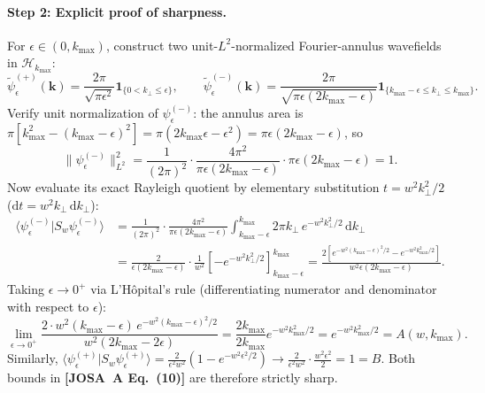 \documentclass[10pt,letterpaper]{article}
\newcommand{\braket}[2]{\langle #1 | #2 \rangle}
\newcommand{\norm}[1]{\lVert #1 \rVert}
\newcommand{\dd}{\mathrm{d}}
\newcommand{\josa}[1]{\textbf{[JOSA~A Eq.~(#1)]}}
\numberwithin{equation}{section}
\begin{document}
\paragraph*{Step 2: Explicit proof of sharpness.}
For $\epsilon \in (0, k_{\max})$, construct two unit-$L^2$-normalized Fourier-annulus wavefields in $\mathcal{H}_{k_{\max}}$:
\begin{equation}
  \widetilde{\psi}_\epsilon^{(+)}(\mathbf{k}) = \frac{2\pi}{\sqrt{\pi\epsilon^2}}\mathbf{1}_{\{0 < k_\perp \le \epsilon\}}, \qquad
  \widetilde{\psi}_\epsilon^{(-)}(\mathbf{k}) = \frac{2\pi}{\sqrt{\pi\epsilon(2k_{\max}-\epsilon)}}\mathbf{1}_{\{k_{\max}-\epsilon \le k_\perp \le k_{\max}\}}.
\end{equation}
Verify unit normalization of $\psi_\epsilon^{(-)}$: the annulus area is $\pi[k_{\max}^2 - (k_{\max}-\epsilon)^2] = \pi(2k_{\max}\epsilon - \epsilon^2) = \pi\epsilon(2k_{\max}-\epsilon)$, so
\begin{equation}
  \norm{\psi_\epsilon^{(-)}}_{L^2}^2 = \frac{1}{(2\pi)^2}\cdot\frac{4\pi^2}{\pi\epsilon(2k_{\max}-\epsilon)}\cdot\pi\epsilon(2k_{\max}-\epsilon) = 1.
\end{equation}
Now evaluate its exact Rayleigh quotient by elementary substitution $t = w^2 k_\perp^2/2$ ($\dd t = w^2 k_\perp\,\dd k_\perp$):
\begin{align}
  \braket{\psi_\epsilon^{(-)}}{S_w\psi_\epsilon^{(-)}} &= \frac{1}{(2\pi)^2}\cdot\frac{4\pi^2}{\pi\epsilon(2k_{\max}-\epsilon)}\int_{k_{\max}-\epsilon}^{k_{\max}} 2\pi k_\perp\,e^{-w^2 k_\perp^2/2}\,\dd k_\perp \nonumber \\
  &= \frac{2}{\epsilon(2k_{\max}-\epsilon)}\cdot\frac{1}{w^2}\left[-e^{-w^2 k_\perp^2/2}\right]_{k_{\max}-\epsilon}^{k_{\max}} = \frac{2\left[e^{-w^2(k_{\max}-\epsilon)^2/2} - e^{-w^2 k_{\max}^2/2}\right]}{w^2\epsilon(2k_{\max}-\epsilon)}.
\end{align}
Taking $\epsilon \to 0^+$ via L'H\^opital's rule (differentiating numerator and denominator with respect to $\epsilon$):
\begin{equation}
  \lim_{\epsilon\to 0^+} \frac{2\cdot w^2(k_{\max}-\epsilon)\,e^{-w^2(k_{\max}-\epsilon)^2/2}}{w^2(2k_{\max} - 2\epsilon)} = \frac{2k_{\max}}{2k_{\max}} e^{-w^2 k_{\max}^2/2} = e^{-w^2 k_{\max}^2/2} = A(w, k_{\max}).
\end{equation}
Similarly, $\braket{\psi_\epsilon^{(+)}}{S_w\psi_\epsilon^{(+)}} = \frac{2}{\epsilon^2 w^2}(1 - e^{-w^2\epsilon^2/2}) \to \frac{2}{\epsilon^2 w^2}\cdot\frac{w^2\epsilon^2}{2} = 1 = B$. Both bounds in \josa{10} are therefore strictly sharp.
\end{document}
